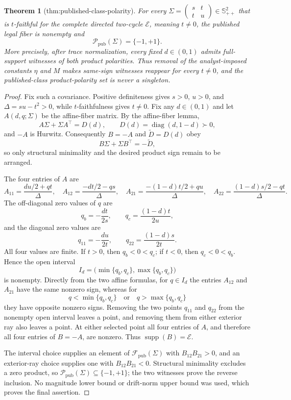 \documentclass{article}
\newtheorem{theorem}{Theorem}
\begin{document}
\begin{theorem}[thm:published-class-polarity]\label{thm:published-class-polarity}
For every \(\Sigma=\begin{pmatrix}s&t\\ t&u\end{pmatrix}\in\mathbb S_{++}^{2}\) that is \(t\)-faithful for the complete directed two-cycle \(\mathcal E\), meaning \(t\ne0\), the published legal fiber is nonempty and
\[
\mathcal P_{\mathrm{pub}}(\Sigma)=\{-1,+1\}.
\]
More precisely, after trace normalization, every fixed \(d\in(0,1)\) admits full-support witnesses of both product polarities. Thus removal of the analyst-imposed constants \(\eta\) and \(M\) makes same-sign witnesses reappear for every \(t\ne0\), and the published-class product-polarity set is never a singleton.
\end{theorem}
\begin{proof}
Fix such a covariance. Positive definiteness gives \(s>0\), \(u>0\), and \(\Delta=su-t^2>0\), while \(t\)-faithfulness gives \(t\ne0\). Fix any \(d\in(0,1)\) and let \(A(d,q;\Sigma)\) be the affine-fiber matrix. By the affine-fiber lemma,
\[
A\Sigma+\Sigma A^{\top}=D(d),
\qquad D(d)=\operatorname{diag}(d,1-d)\succ0,
\]
and \(-A\) is Hurwitz. Consequently \(B=-A\) and \(\widetilde D=D(d)\) obey
\[
B\Sigma+\Sigma B^{\top}=-\widetilde D,
\]
so only structural minimality and the desired product sign remain to be arranged.

The four entries of \(A\) are
\[
A_{11}=\frac{du/2+qt}{\Delta},\quad
A_{12}=\frac{-dt/2-qs}{\Delta},\quad
A_{21}=\frac{-(1-d)t/2+qu}{\Delta},\quad
A_{22}=\frac{(1-d)s/2-qt}{\Delta}.
\]
The off-diagonal zero values of \(q\) are
\[
q_b=-\frac{dt}{2s},
\qquad
q_c=\frac{(1-d)t}{2u},
\]
and the diagonal zero values are
\[
q_{11}=-\frac{du}{2t},
\qquad
q_{22}=\frac{(1-d)s}{2t}.
\]
All four values are finite. If \(t>0\), then \(q_b<0<q_c\); if \(t<0\), then \(q_c<0<q_b\). Hence the open interval
\[
I_d=\bigl(\min\{q_b,q_c\},\max\{q_b,q_c\}\bigr)
\]
is nonempty. Directly from the two affine formulas, for \(q\in I_d\) the entries \(A_{12}\) and \(A_{21}\) have the same nonzero sign, whereas for
\[
q<\min\{q_b,q_c\}
\quad\text{or}\quad
q>\max\{q_b,q_c\}
\]
they have opposite nonzero signs. Removing the two points \(q_{11}\) and \(q_{22}\) from the nonempty open interval leaves a point, and removing them from either exterior ray also leaves a point. At either selected point all four entries of \(A\), and therefore all four entries of \(B=-A\), are nonzero. Thus \(\operatorname{supp}(B)=\mathcal E\).

The interval choice supplies an element of \(\mathcal F_{\mathrm{pub}}(\Sigma)\) with \(B_{12}B_{21}>0\), and an exterior-ray choice supplies one with \(B_{12}B_{21}<0\). Structural minimality excludes a zero product, so \(\mathcal P_{\mathrm{pub}}(\Sigma)\subseteq\{-1,+1\}\); the two witnesses prove the reverse inclusion. No magnitude lower bound or drift-norm upper bound was used, which proves the final assertion.
\end{proof}
\end{document}
